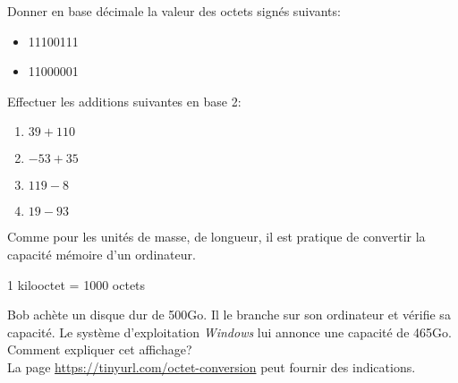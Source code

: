 \documentclass[a4paper,11pt]{article}
\begin{document}
\begin{exo}
    Donner en base décimale la valeur des octets signés suivants:
    \begin{itemize}
        \item 11100111
        \item 11000001
    \end{itemize}
\end{exo}
\begin{exo}
    Effectuer les additions suivantes en base 2:
    \begin{enumerate}
        \item $39+110$
        \item $-53+35$
        \item $119-8$
        \item $19-93$
    \end{enumerate}
\end{exo}
\begin{exo}
    Comme pour les unités de masse, de longueur, il est pratique de convertir la capacité mémoire d'un ordinateur.
    \begin{center}
    1 kilooctet = 1000 octets
    \end{center}
    Bob achète un disque dur de 500Go. Il le branche sur son ordinateur et vérifie sa capacité. Le système d'exploitation \emph{Windows} lui annonce une capacité de 465Go. Comment expliquer cet affichage?
    \\La page \url{https://tinyurl.com/octet-conversion} peut fournir des indications.
\end{exo}
\end{document}
